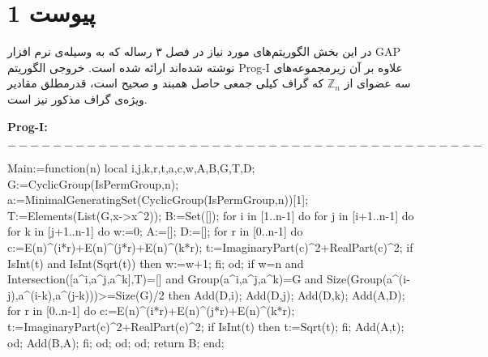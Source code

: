 \chapter*{پیوست‌ 1}
\thispagestyle{empty}
در این بخش الگوریتم‌های مورد نیاز در فصل ۳ رساله که به وسیله‌ی نرم‌ افزار GAP نوشته شده‌اند ارائه شده است. 
خروجی الگوریتم  Prog-I علاوه بر آن زیرمجموعه‌های سه عضوای از $\mathbb{Z}_n $ که  گراف کیلی جمعی حاصل همبند و صحیح است، 
قدرمطلق مقادیر ویژه‌ی گراف مذکور  نیز است. 
 
\hspace{1cm}
\begin{latin}
\noindent \bf Prog-I:
\end{latin}
$------------------------------------------$
\begin{code}
Main:=function(n)
local i,j,k,r,t,a,c,w,A,B,G,T,D;
G:=CyclicGroup(IsPermGroup,n);
a:=MinimalGeneratingSet(CyclicGroup(IsPermGroup,n))[1];
T:=Elements(List(G,x->x^2));     B:=Set([]);
for i in [1..n-1] do
  for j in [i+1..n-1] do
    for k in [j+1..n-1] do
      w:=0; A:=[]; D:=[];
      for r in [0..n-1] do
        c:=E(n)^(i*r)+E(n)^(j*r)+E(n)^(k*r);
        t:=ImaginaryPart(c)^2+RealPart(c)^2;
        if IsInt(t)  and IsInt(Sqrt(t)) then   w:=w+1;
        fi;
      od;
      if w=n and Intersection([a^i,a^j,a^k],T)=[]
         and Group(a^i,a^j,a^k)=G
         and Size(Group(a^(i-j),a^(i-k),a^(j-k)))>=Size(G)/2
      then
         Add(D,i); Add(D,j); Add(D,k); Add(A,D);
         for r in [0..n-1] do
           c:=E(n)^(i*r)+E(n)^(j*r)+E(n)^(k*r);
           t:=ImaginaryPart(c)^2+RealPart(c)^2;
           if IsInt(t) then  t:=Sqrt(t);
           fi;
           Add(A,t);
         od;
         Add(B,A);
      fi;
    od;
  od;
od;
return B;
end;
\end{code}
